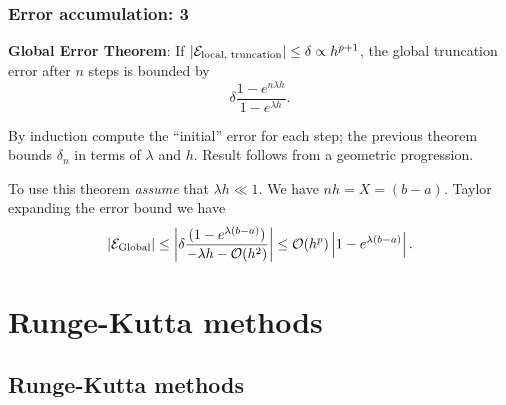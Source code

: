 \documentclass{beamer}
\begin{document}
\begin{frame}
  \frametitle{Error accumulation: 3}

  {\bf Global Error Theorem}: If $|{\cal E}_{\text{local,
      truncation}}| \le \delta \propto h^{p+1}$, the global truncation
  error after $n$ steps is bounded by
  \begin{equation*}
    \delta \frac{1 - e^{n \lambda h}}{1 - e^{\lambda h}}.
  \end{equation*} \pause

  \vspace{1ex}

  By induction compute the ``initial'' error for each step; the
  previous theorem bounds $\delta_n$ in terms of $\lambda$ and
  $h$. Result follows from a geometric progression.  \pause

  \vspace{1ex}

  To use this theorem \emph{assume} that $\lambda h \ll 1$. We have $n
  h = X = (b - a)$. Taylor expanding the error bound we have
  \begin{equation*}
    |{\cal E}_{\text{Global}}|  \leq \left| \delta \frac{(1 -
      e^{\lambda(b-a)})}{-\lambda h - {\cal O}(h^2)} \right|
    \leq {\cal O}(h^p) \left| 1 - e^{\lambda(b-a)} \right|.
  \end{equation*}

\end{frame}


\section{Runge-Kutta methods}

\subsection{Runge-Kutta methods}
\end{document}
